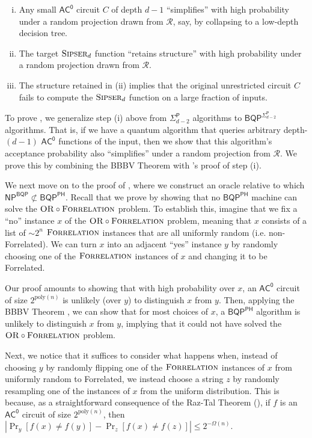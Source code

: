 \documentclass[11pt]{article}%
\newcommand{\poly}{\mathrm{poly}}
\newcommand{\Sipser}{\normalfont\textsc{Sipser}}
\newcommand{\OR}{\normalfont\textsc{OR}}
\newcommand{\Forrelation}{\normalfont\textsc{Forrelation}}
\begin{document}
\begin{enumerate}[(i)]
\item Any small $\mathsf{AC^0}$ circuit $C$ of depth $d-1$ ``simplifies'' with high probability under a random projection drawn from $\mathcal{R}$, say, by collapsing to a low-depth decision tree.
\item The target $\Sipser_d$ function ``retains structure''  with high probability under a random projection drawn from $\mathcal{R}$.
\item The structure retained in (ii) implies that the original unrestricted circuit $C$ fails to compute the $\Sipser_d$ function on a large fraction of inputs.
\end{enumerate}

To prove , we generalize step (i) above from $\mathsf{\Sigma}_{d-2}^\mathsf{P}$ algorithms to $\mathsf{BQP}^{\mathsf{\Sigma}_{d-2}^\mathsf{P}}$ algorithms. That is, if we have a quantum algorithm that queries arbitrary depth-$(d-1)$ $\mathsf{AC^0}$ functions of the input, then we show that this algorithm's acceptance probability also ``simplifies'' under a random projection from $\mathcal{R}$.  We prove this by combining the BBBV Theorem \cite{BBBV97} with \cite{HRST17}'s proof of step (i).

\bigskip

We next move on to the proof of , where we construct an oracle relative to which $\mathsf{NP^{BQP}}\not\subset\mathsf{BQP^{PH}}$. Recall that we prove  by showing that no $\mathsf{BQP}^\mathsf{PH}$ machine can solve the $\OR \circ \Forrelation$ problem. To establish this, imagine that we fix a ``no'' instance $x$ of the $\OR \circ \Forrelation$ problem, meaning that $x$ consists of a list of $\sim 2^n$ $\Forrelation$ instances that are all uniformly random (i.e. non-Forrelated). We can turn $x$ into an adjacent ``yes'' instance $y$ by randomly choosing one of the $\Forrelation$ instances of $x$ and changing it to be Forrelated.

Our proof amounts to showing that with high probability over $x$, an $\mathsf{AC^0}$ circuit of size $2^{\poly(n)}$ is unlikely (over $y$) to distinguish $x$ from $y$. Then, applying the BBBV Theorem \cite{BBBV97}, we can show that for most choices of $x$, a $\mathsf{BQP}^\mathsf{PH}$ algorithm is unlikely to distinguish $x$ from $y$, implying that it could not have solved the $\OR \circ \Forrelation$ problem.

Next, we notice that it suffices to consider what happens when, instead of choosing $y$ by randomly flipping one of the $\Forrelation$ instances of $x$ from uniformly random to Forrelated, we instead choose a string $z$ by randomly resampling one of the instances of $x$ from the uniform distribution. This is because, as a straightforward consequence of the Raz-Tal Theorem (), if $f$ is an $\mathsf{AC^0}$ circuit of size $2^{\poly(n)}$, then $\left|\Pr_y[f(x) \neq f(y)] - \Pr_{z}[f(x) \neq f(z)] \right| \le 2^{-\Omega(n)}$.
\end{document}
